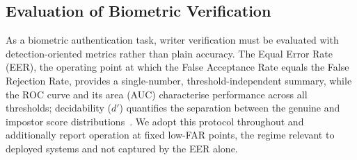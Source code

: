 \subsection{Evaluation of Biometric Verification}
As a biometric authentication task, writer verification must be evaluated with
detection-oriented metrics rather than plain accuracy. The Equal Error Rate
(EER), the operating point at which the False Acceptance Rate equals the False
Rejection Rate, provides a single-number, threshold-independent summary, while
the ROC curve and its area (AUC) characterise performance across all
thresholds; decidability ($d'$) quantifies the separation between the genuine
and impostor score distributions~\cite{mansfield2002}. We adopt this protocol
throughout and additionally report operation at fixed low-FAR points, the
regime relevant to deployed systems and not captured by the EER alone.